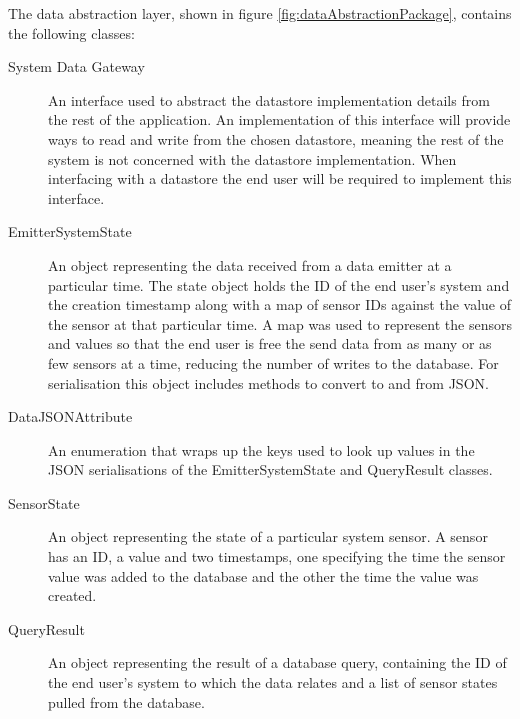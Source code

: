 The data abstraction layer, shown in figure \ref{fig:dataAbstractionPackage}, contains the following classes:
\begin{description}
\item [System Data Gateway]  An interface used to abstract the datastore implementation details from the rest of the application. An implementation of this interface will provide ways to read and write from the chosen datastore, meaning the rest of the system is not concerned with the datastore implementation. When interfacing with a datastore the end user will be required to implement this interface.
\item [EmitterSystemState] An object representing the data received from a data emitter at a particular time. The state object holds the ID of the end user's system and the creation timestamp along with a map of sensor IDs against the value of the sensor at that particular time. A map was used to represent the sensors and values so that the end user is free the send data from as many or as few sensors at a time, reducing the number of writes to the database. For serialisation this object includes methods to convert to and from JSON.
\item [DataJSONAttribute] An enumeration that wraps up the keys used to look up values in the JSON serialisations of the EmitterSystemState and QueryResult classes.
\item [SensorState] An object representing the state of a particular system sensor. A sensor has an ID, a value and two timestamps, one specifying the time the sensor value was added to the database and the other the time the value was created.
\item [QueryResult] An object representing the result of a database query, containing the ID of the end user's system to which the data relates and a list of sensor states pulled from the database.


\end{description}

